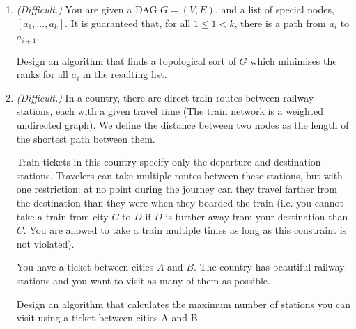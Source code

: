 \documentclass{article}
\begin{document}
\begin{enumerate}
    \item \emph{(Difficult.)} You are given a DAG $G=(V,E)$, and a list of special nodes, $[a_1, ..., a_k]$. It is guaranteed that, for all $1 \leq 1 < k$, there is a path from $a_i$ to $a_{i+1}$.

    Design an algorithm that finds a topological sort of $G$ which minimises the ranks for all $a_i$ in the resulting list.

    \item \emph{(Difficult.)} In a country, there are direct train routes between railway stations, each with a given travel time (The train network is a weighted undirected graph). We define the distance between two nodes as the length of the shortest path between them.

Train tickets in this country specify only the departure and destination stations. Travelers can take multiple routes between these stations, but with one restriction: at no point during the journey can they travel farther from the destination than they were when they boarded the train (i.e. you cannot take a train from city $C$ to $D$ if $D$ is further away from your destination than $C$. You are allowed to take a train multiple times as long as this constraint is not violated).

You have a ticket between cities $A$ and $B$. The country has beautiful railway stations and you want to visit as many of them as possible.

Design an algorithm that calculates the maximum number of stations you can visit using a ticket between cities A and B.
\end{enumerate}
\end{document}
